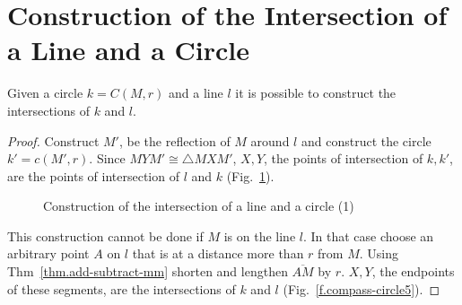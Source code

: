 
\section{Construction of the Intersection of a Line and a Circle}\label{s.line-circle}

\begin{theorem}
Given a circle $k=C(M,r)$ and a line $l$ it is possible to construct the intersections of $k$ and $l$.
\end{theorem}

\begin{proof}
Construct $M'$, be the reflection of $M$ around $l$ and construct the circle $k'=c(M',r)$. Since $MYM'\cong\triangle MXM'$, $X,Y$, the points of intersection of $k,k'$, are the points of intersection of $l$ and $k$ (Fig.~\ref{f.compass-circle4}).
\begin{figure}[t]
\begin{center}
\end{center}
\caption{Construction of  the intersection of a line and a circle (1)}\label{f.compass-circle4}
\end{figure}

This construction cannot be done if $M$ is on the line $l$. In that case choose an arbitrary point $A$ on $l$ that is at a distance more than $r$ from $M$. Using Thm~\ref{thm.add-subtract-mm} shorten and lengthen $\overline{AM}$ by $r$. $X,Y$, the endpoints of these segments, are the intersections of $k$ and $l$ (Fig.~\ref{f.compass-circle5}).
\end{proof}

